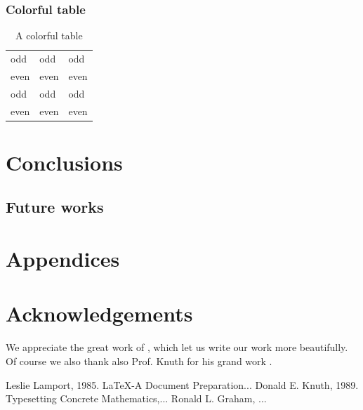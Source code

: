 \documentclass[11pt, a4paper]{article}
\begin{document}
\subsubsection{Colorful table}

\begin{center}
\begin{table}[h]
\begin{tabular}{lll}
odd     & odd   & odd \\
even    & even  & even\\
odd     & odd   & odd \\
even    & even  & even\\
\end{tabular}
\caption{A colorful table}
\end{table}
\end{center}


\section{Conclusions}
\subsection{Future works}




\section{Appendices}
\section{Acknowledgements} %
We appreciate the great work of \cite{lamport94}, which let us write our work more beautifully. Of course we also thank also Prof. Knuth for his grand work \cite[p.~215]{knuth2014}.


%       

\begin{thebibliography}{10}
 Leslie Lamport, 1985. \LaTeX{}-A Document Preparation...
Donald E. Knuth, 1989. Typesetting Concrete Mathematics,...
Ronald L. Graham, ...
\end{thebibliography}
\end{document}
